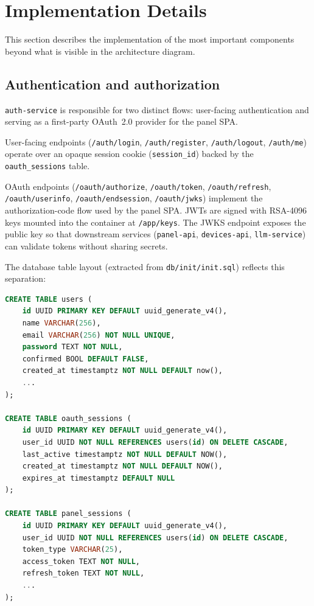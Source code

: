 \documentclass[a4paper,12pt]{article}
\begin{document}
\section{Implementation Details}
\label{sec:impl}

This section describes the implementation of the most important components beyond what is visible in the architecture diagram.

\subsection{Authentication and authorization}

\verb|auth-service| is responsible for two distinct flows: user-facing authentication and serving as a first-party OAuth~2.0 provider for the panel SPA.

User-facing endpoints (\verb|/auth/login|, \verb|/auth/register|, \verb|/auth/logout|, \verb|/auth/me|) operate over an opaque session cookie (\verb|session_id|) backed by the \verb|oauth_sessions| table.

OAuth endpoints (\verb|/oauth/authorize|, \verb|/oauth/token|, \verb|/oauth/refresh|, \verb|/oauth/userinfo|, \verb|/oauth/endsession|, \verb|/oauth/jwks|) implement the authorization-code flow used by the panel SPA. JWTs are signed with RSA-4096 keys mounted into the container at \verb|/app/keys|. The JWKS endpoint exposes the public key so that downstream services (\verb|panel-api|, \verb|devices-api|, \verb|llm-service|) can validate tokens without sharing secrets.

The database table layout (extracted from \verb|db/init/init.sql|) reflects this separation:

\begin{lstlisting}[language=SQL,caption={Core authentication tables}]
CREATE TABLE users (
    id UUID PRIMARY KEY DEFAULT uuid_generate_v4(),
    name VARCHAR(256),
    email VARCHAR(256) NOT NULL UNIQUE,
    password TEXT NOT NULL,
    confirmed BOOL DEFAULT FALSE,
    created_at timestamptz NOT NULL DEFAULT now(),
    ...
);

CREATE TABLE oauth_sessions (
    id UUID PRIMARY KEY DEFAULT uuid_generate_v4(),
    user_id UUID NOT NULL REFERENCES users(id) ON DELETE CASCADE,
    last_active timestamptz NOT NULL DEFAULT NOW(),
    created_at timestamptz NOT NULL DEFAULT NOW(),
    expires_at timestamptz DEFAULT NULL
);

CREATE TABLE panel_sessions (
    id UUID PRIMARY KEY DEFAULT uuid_generate_v4(),
    user_id UUID NOT NULL REFERENCES users(id) ON DELETE CASCADE,
    token_type VARCHAR(25),
    access_token TEXT NOT NULL,
    refresh_token TEXT NOT NULL,
    ...
);
\end{lstlisting}
\end{document}
